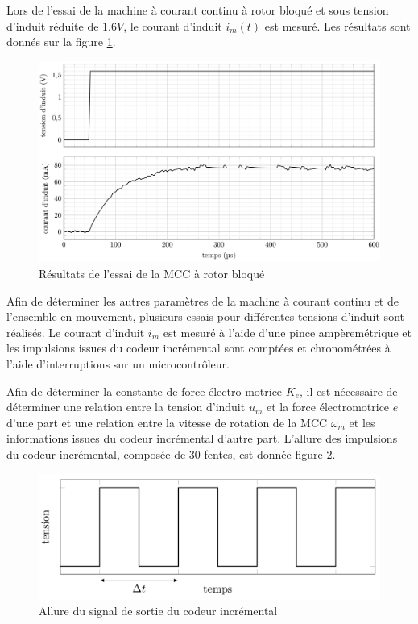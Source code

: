 Lors de l'essai de la machine à courant continu à rotor bloqué et sous tension d'induit réduite de $1.6V$, le courant d'induit $i_m(t)$ est mesuré. Les résultats sont donnés sur la figure \ref{img09}.

\begin{figure}[!h]
\centering\includegraphics[width=0.8\linewidth]{img/figure_09}
 \caption{Résultats de l'essai de la MCC à rotor bloqué}
 \label{img09}
\end{figure}


Afin de déterminer les autres paramètres de la machine à courant continu et de l'ensemble en mouvement, plusieurs essais pour différentes tensions d'induit sont réalisés. Le courant d'induit $i_m$ est mesuré à l'aide d'une pince ampèremétrique et les impulsions issues du codeur incrémental sont comptées et chronométrées à l'aide d'interruptions sur un microcontrôleur.

Afin de déterminer la constante de force électro-motrice $K_e$, il est nécessaire de déterminer une relation entre la tension d'induit $u_m$ et la force électromotrice $e$ d'une part et une relation entre la vitesse de rotation de la MCC $\omega_m$ et les informations issues du codeur incrémental d'autre part. L'allure des impulsions du codeur incrémental, composée de 30 fentes, est donnée figure \ref{img10}.


\begin{figure}[!h]
\centering\includegraphics[width=0.5\linewidth]{img/figure_10}
 \caption{Allure du signal de sortie du codeur incrémental}
 \label{img10}
\end{figure}

